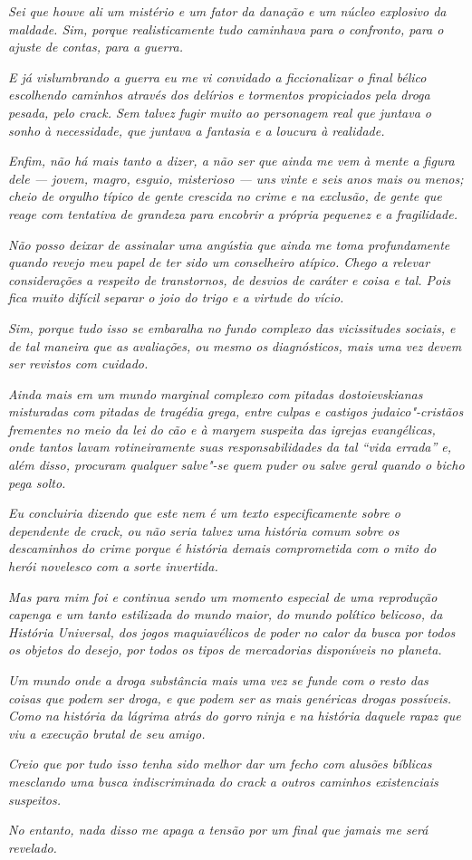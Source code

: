 \emph{Sei que houve ali um mistério e um fator da danação e um núcleo
explosivo da maldade. Sim, porque realisticamente tudo caminhava para o
confronto, para o ajuste de contas, para a guerra.}

\emph{E já vislumbrando a guerra eu me vi convidado a ficcionalizar o
final bélico escolhendo caminhos através dos delírios e tormentos
propiciados pela droga pesada, pelo crack. Sem talvez fugir muito ao
personagem real que juntava o sonho à necessidade, que juntava a
fantasia e a loucura à realidade.}

\emph{Enfim, não há mais tanto a dizer, a não ser que ainda me vem à
mente a figura dele --- jovem, magro, esguio, misterioso --- uns vinte e
seis anos mais ou menos; cheio de orgulho típico de gente crescida no
crime e na exclusão, de gente que reage com tentativa de grandeza para
encobrir a própria pequenez e a fragilidade.}

\emph{Não posso deixar de assinalar uma angústia que ainda me toma
profundamente quando revejo meu papel de ter sido um conselheiro
atípico. Chego a relevar considerações a respeito de transtornos, de
desvios de caráter e coisa e tal. Pois fica muito difícil separar o joio
do trigo e a virtude do vício.}

\emph{Sim, porque tudo isso se embaralha no fundo complexo das
vicissitudes sociais, e de tal maneira que as avaliações, ou mesmo os
diagnósticos, mais uma vez devem ser revistos com cuidado.}

\emph{Ainda mais em um mundo marginal complexo com pitadas
dostoievskianas misturadas com pitadas de tragédia grega, entre culpas e
castigos judaico"-cristãos frementes no meio da lei do cão e à margem
suspeita das igrejas evangélicas, onde tantos lavam rotineiramente suas
responsabilidades da tal ``vida errada'' e, além disso, procuram
qualquer salve"-se quem puder ou salve geral quando o bicho pega solto.}

\emph{Eu concluiria dizendo que este nem é um texto especificamente
sobre o dependente de crack, ou não seria talvez uma história comum sobre
os descaminhos do crime porque é história demais comprometida com o mito
do herói novelesco com a sorte invertida.}

\emph{Mas para mim foi e continua sendo um momento especial de uma
reprodução capenga e um tanto estilizada do mundo maior, do mundo
político belicoso, da História Universal, dos jogos maquiavélicos de
poder no calor da busca por todos os objetos do desejo, por todos os
tipos de mercadorias disponíveis no planeta.}

\emph{Um mundo onde a droga substância mais uma vez se funde com o resto
das coisas que podem ser droga, e que podem ser as mais genéricas drogas
possíveis. Como na história da lágrima atrás do gorro ninja e na história
daquele rapaz que viu a execução brutal de seu amigo.}

\emph{Creio que por tudo isso tenha sido melhor dar um fecho com alusões
bíblicas mesclando uma busca indiscriminada do crack a outros caminhos
existenciais suspeitos.}

\emph{No entanto, nada disso me apaga a tensão por um final que jamais
me será revelado.~}
\endgroup